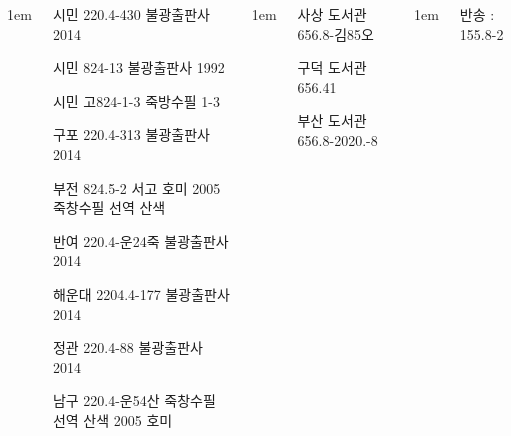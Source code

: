 \documentclass[	20pt, 
							a1paper, 
							portrait, %
							margin=0mm, %
							innermargin=10mm,  		%
							colspace=5mm, 
							subcolspace=0mm
							]{tikzposter}
\begin{document}
\begin{columns}
			{
					\setlength{\leftmargini}{4em}
					\setlength{\labelsep} {1em}
				\begin{LARGE}

시민  220.4-430  불광출판사 2014       %

시민  824-13  불광출판사 1992

시민  고824-1-3  죽방수필 1-3  

구포  220.4-313  불광출판사 2014       %

부전  824.5-2  서고  호미 2005  죽창수필 선역 산색  %

반여  220.4-운24죽  불광출판사 2014  %

해운대 2204.4-177 불광출판사 2014   %

정관  220.4-88 불광출판사 2014         %

남구  220.4-운54산  죽창수필 선역  산색  2005 호미  %
				\end{LARGE}
			}







			{
					\setlength{\leftmargini}{4em}
					\setlength{\labelsep} {1em}
				\begin{LARGE}
사상 도서관  656.8-김85오  %

구덕 도서관  656.41  %

부산 도서관  656.8-2020.-8  %
				\end{LARGE}
			}



			{
					\setlength{\leftmargini}{4em}
					\setlength{\labelsep} {1em}
				\begin{LARGE}
반송  : 155.8-2  %


\end{LARGE}}
\end{columns}
\end{document}
